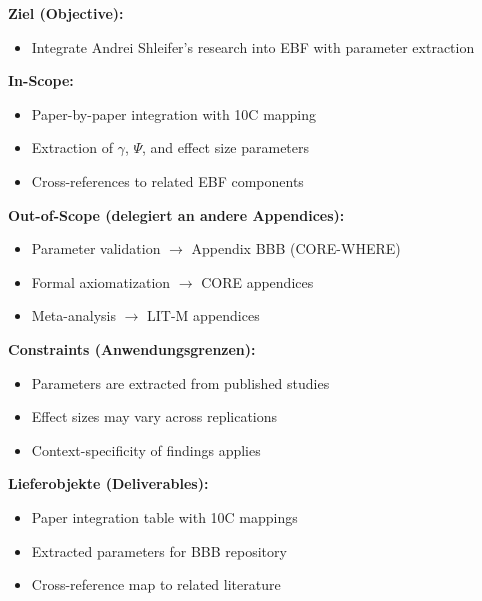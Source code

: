 
\begin{tcolorbox}[
    colback=orange!5!white,
    colframe=orange!75!black,
    title={\textbf{Appendix Scope: Ziel / In-Scope / Out-of-Scope / Constraints}},
    fonttitle=\bfseries
]

\textbf{Ziel (Objective):}
\begin{itemize}[nosep]
    \item Integrate Andrei Shleifer's research into EBF with parameter extraction
\end{itemize}

\textbf{In-Scope:}
\begin{itemize}[nosep]
    \item Paper-by-paper integration with 10C mapping
    \item Extraction of $\gamma$, $\Psi$, and effect size parameters
    \item Cross-references to related EBF components
\end{itemize}

\textbf{Out-of-Scope (delegiert an andere Appendices):}
\begin{itemize}[nosep]
    \item Parameter validation $\rightarrow$ Appendix BBB (CORE-WHERE)
    \item Formal axiomatization $\rightarrow$ CORE appendices
    \item Meta-analysis $\rightarrow$ LIT-M appendices
\end{itemize}

\textbf{Constraints (Anwendungsgrenzen):}
\begin{itemize}[nosep]
    \item Parameters are extracted from published studies
    \item Effect sizes may vary across replications
    \item Context-specificity of findings applies
\end{itemize}

\textbf{Lieferobjekte (Deliverables):}
\begin{itemize}[nosep]
    \item Paper integration table with 10C mappings
    \item Extracted parameters for BBB repository
    \item Cross-reference map to related literature
\end{itemize}

\end{tcolorbox}

